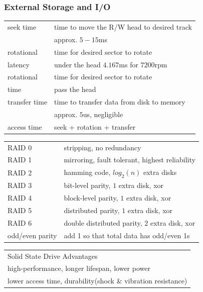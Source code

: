 \documentclass[10pt]{article}
\begin{document}
\begin{multicols*}{2}
    \subsubsection*{External Storage and I/O}
    \begin{tcolorbox}[title=Hard Disk Access RAID and SSD]
        \begin{tabular}{ll}
            seek time     & time to move the R/W head to desired track \\
            ~             & approx. $5-15$ms                           \\
            rotational    & time for desired sector to rotate          \\
            latency       & under the head $4.167$ms for $7200$rpm     \\
            rotational    & time for desired sector to rotate          \\
            time          & pass the head                              \\
            transfer time & time to transfer data from disk to memory  \\
            ~             & approx. $5$us, negligible                  \\
            access time   & seek + rotation + transfer                 \\
        \end{tabular}
        \begin{tabular}{ll}
            \hline
            RAID 0          & stripping, no redundancy                       \\
            RAID 1          & mirroring, fault tolerant, highest reliability \\
            RAID 2          & hamming code, $log_2(n)$ extra disks           \\
            RAID 3          & bit-level parity, $1$ extra disk, xor          \\
            RAID 4          & block-level parity, $1$ extra disk, xor        \\
            RAID 5          & distributed parity, $1$ extra disk, xor        \\
            RAID 6          & double distributed parity, $2$ extra disk, xor \\
            odd/even parity & add 1 so that total data has odd/even 1s       \\
            \hline
        \end{tabular}
        \begin {tabular}{l}
        Solid State Drive Advantages \\
        high-performance, longer lifespan, lower power \\
        lower access time, durability(shock \& vibration resistance)
        \end{tabular}
    \end{tcolorbox}


\end{multicols*}
\end{document}

